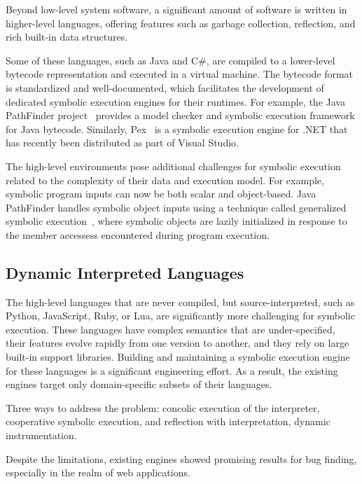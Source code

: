 Beyond low-level system software, a significant amount of software is written in higher-level languages, offering features such as garbage collection, reflection, and rich built-in data structures.

Some of these languages, such as Java and C\#, are compiled to a lower-level bytecode representation and executed in a virtual machine.
%
The bytecode format is standardized and well-documented, which facilitates the development of dedicated symbolic execution engines for their runtimes.
%
For example, the Java PathFinder project~\cite{visser-jpf,jpf-symbex,jpf-testgen} provides a model checker and symbolic execution framework for Java bytecode.
%
Similarly, Pex~\cite{tillmann-pex} is a symbolic execution engine for .NET that has recently been distributed as part of Visual Studio.

The high-level environments pose additional challenges for symbolic execution related to the complexity of their data and execution model.  For example, symbolic program inputs can now be both scalar and object-based.
%
Java PathFinder handles symbolic object inputs using a technique called generalized symbolic execution~\cite{generalized-symbex}, where symbolic objects are lazily initialized in response to the member accessess encountered during program execution.

\subsection{Dynamic Interpreted Languages}

The high-level languages that are never compiled, but source-interpreted, such as Python, JavaScript, Ruby, or Lua, are significantly more challenging for symbolic execution.
%
These languages have complex semantics that are under-specified, their features evolve rapidly from one version to another, and they rely on large built-in support libraries.
%
Building and maintaining a symbolic execution engine for these languages is a significant engineering effort.  As a result, the existing engines target only domain-specific subsets of their languages.

Three ways to address the problem: concolic execution of the interpreter, cooperative symbolic execution, and reflection with interpretation, dynamic instrumentation.

Despite the limitations, existing engines showed promising results for bug finding, especially in the realm of web applications.


